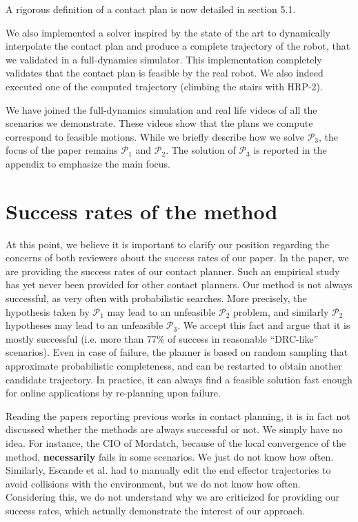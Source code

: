 \documentclass[a4paper]{article}
\begin{document}
A rigorous definition of a contact plan is now detailed in section 5.1. 


We also implemented a solver inspired by the state of the art to dynamically interpolate the contact plan and produce a complete trajectory of the robot, that we validated in a full-dynamics simulator. 
This implementation completely validates that the contact plan is feasible by the real robot.
We also indeed executed one of the computed trajectory (climbing the stairs with HRP-2).

We have joined the full-dynamics simulation and real life videos of all the scenarios we demonstrate.
These videos show that the plans we compute correspond to feasible motions.
While we briefly describe how we solve $\mathcal{P}_3$, the focus of the paper remains $\mathcal{P}_1$ and $\mathcal{P}_2$. 
The solution of $\mathcal{P}_3$ is reported in the appendix to emphasize the main focus.

\newcommand{\mP}[1]{$\mathcal{P}_#1$}

\section{Success rates of the method}
At this point, we believe it is important to clarify our position regarding the concerns of both reviewers about the success rates of our paper.
In the paper, we are providing the success rates of our contact planner. 
Such an empirical study has yet never been provided for other contact planners.
Our method is not always successful, as very often with probabilistic searches.
More precisely, the hypothesis taken by \mP1 may lead to an unfeasible \mP2 problem, and similarly \mP2 hypotheses may lead to an unfeasible \mP3.
We accept this fact and argue that it is mostly successful (i.e. more than 77\% of success in reasonable ``DRC-like'' scenarios).
Even in case of failure, the planner is based on random sampling that approximate probabilistic completeness, and can be restarted to obtain another candidate trajectory.
In practice, it can always find a feasible solution fast enough for online applications by re-planning upon failure.

Reading the papers reporting previous works in contact planning, it is in fact not discussed whether the methods are always successful or not. We simply have no idea. For instance, the CIO of Mordatch,
because of the local convergence of the method, \textbf{necessarily} fails in some scenarios. We just do not know how often. Similarly, Escande et al. had to manually edit 
the end effector trajectories to avoid collisions with the environment, but we do not know how often. Considering this,
we do not understand why we are criticized for providing our success rates, which actually demonstrate the interest of our approach.
\end{document}
